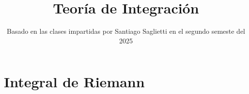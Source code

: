 \documentclass[a4paper]{report}
\title{Teoría de Integración}
\author{}
\date{Basado en las clases impartidas por Santiago Saglietti en el segundo semeste del 2025}
\begin{document}
    \maketitle
    \tableofcontents

    \chapter{Integral de Riemann}
    \setcounter{section}{0}

	
	
	
	
	
	
	
	
	
	
	
	
	
	
	
	
	
	
	
	
	
	
	


\end{document}
